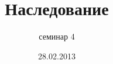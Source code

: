 \documentclass[hyperref={unicode,colorlinks=true,urlbordercolor=blue,linkcolor=blue,urlcolor=blue,pdfborderstyle={/S/U/W 1}}]{beamer}
\title{Наследование}
\subtitle{семинар 4}
\date{28.02.2013}
\begin{document}
\frame{\titlepage}


\end{document}
